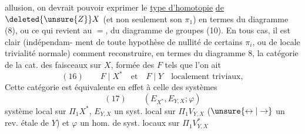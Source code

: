 allusion, on devrait pouvoir exprimer 
le \uline{type d'homotopie} \uline{de} $\deleted{\unsure{Z}}X$
(et non seulement son $\pi_1$) en termes du
diagramme  (8), ou ce qui revient au
$=$, du diagramme de groupes (10).
En tous cas, il est clair (indépendam-
ment de toute hypothèse de nullité de
certains $\pi_i$, ou de locale trivialité normale)
comment reconstruire, en termes du
diagramme 8, la  catégorie  de la cat. des
faisceaux sur $X$,  formée des $F$ tels
que l'on ait
\[
(16)\qquad F\mid X^*\quad\text{et}\quad F\mid Y\quad\text{localement triviaux},
\]
Cette catégorie  est équivalente en effet
à celle des systèmes
\[
(17)\qquad (E_{X^*},E_{Y,X};\varphi)
\]
 système local sur $\Pi_1 X^*$, $E_{Y,X}$ un
syst. local sur $\Pi_1 V_{Y,X}$ ($\unsure{\leftrightarrow|\rightarrow}$ un rev. étale
de $Y$) et $\varphi$ un hom. de syst. locaux sur $\Pi_1V^*_{Y,X}$
